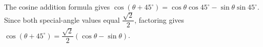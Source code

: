 The cosine addition formula gives $\cos(\theta+45^\circ)=\cos\theta\cos 45^\circ-\sin\theta\sin 45^\circ$. Since both special-angle values equal $\dfrac{\sqrt{2}}{2}$, factoring gives $\boxed{\cos(\theta+45^\circ)=\dfrac{\sqrt 2}{2}(\cos\theta-\sin\theta)}$.
